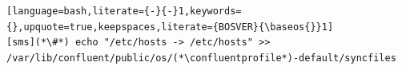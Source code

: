 \begin{lstlisting}[language=bash,literate={-}{-}1,keywords={},upquote=true,keepspaces,literate={BOSVER}{\baseos{}}1]
[sms](*\#*) echo "/etc/hosts -> /etc/hosts" >> /var/lib/confluent/public/os/(*\confluentprofile*)-default/syncfiles

\end{lstlisting}



